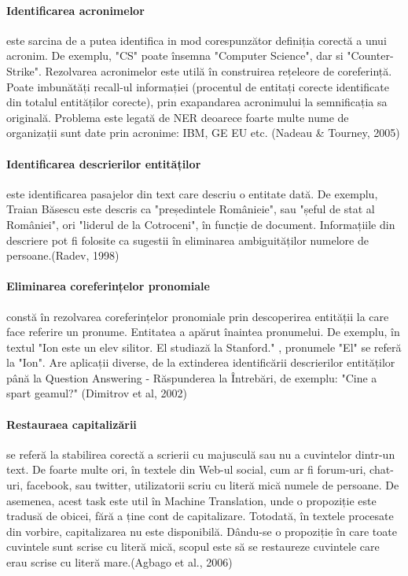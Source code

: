 \paragraph{Identificarea acronimelor}

este sarcina de a putea identifica in mod corespunzător definiția corectă a unui acronim. De exemplu, "CS" poate însemna "Computer Science", dar si "Counter-Strike". Rezolvarea  acronimelor este utilă în construirea rețeleore de coreferință. Poate imbunătăți recall-ul informației (procentul de entitați corecte identificate din totalul entităților corecte), prin exapandarea acronimului la semnificația sa originală. Problema este legată de NER deoarece foarte multe nume de organizații sunt date prin acronime: IBM, GE EU etc. (Nadeau \& Tourney, 2005)\cite{Nadeau05asupervised}

\paragraph{Identificarea descrierilor entităților}

este identificarea pasajelor din text care descriu o entitate dată. De exemplu, Traian Băsescu este descris ca "președintele Românieie", sau "șeful de stat al României", ori "liderul de la Cotroceni", în funcție de document. Informațiile din descriere pot fi folosite ca sugestii în eliminarea ambiguităților numelore de persoane.(Radev, 1998)\cite{Radev98learningcorrelations}

\paragraph{Eliminarea coreferințelor pronomiale}

constă în rezolvarea coreferințelor pronomiale prin descoperirea entității la care face referire un pronume. Entitatea a apărut înaintea pronumelui. De exemplu, în textul "Ion este un elev silitor. El studiază la Stanford." , pronumele "El" se referă la "Ion". Are aplicații diverse, de la extinderea identificării descrierilor entităților până la Question Answering - Răspunderea la Întrebări, de exemplu: "Cine a spart geamul?" (Dimitrov et al, 2002)\cite{Dimitrov02alight-weight}

\paragraph{Restauraea capitalizării}

se referă la stabilirea corectă a scrierii cu majusculă sau nu a cuvintelor dintr-un text. De foarte multe ori, în textele din Web-ul social, cum ar fi forum-uri, chat-uri, facebook, sau twitter, utilizatorii scriu cu literă mică numele de persoane. De asemenea, acest task este util în Machine Translation, unde o propoziție este tradusă de obicei, fără a ține cont de capitalizare. Totodată, în textele procesate din vorbire, capitalizarea nu este disponibilă. Dându-se o propoziție în care toate cuvintele sunt scrise cu literă mică, scopul este să se restaureze cuvintele care erau scrise cu literă mare.(Agbago et al., 2006)\cite{Agbago06}



